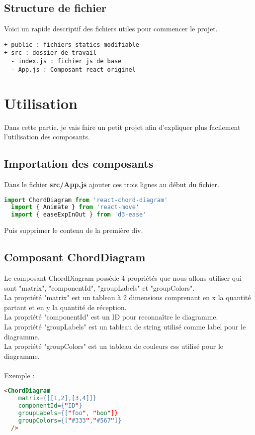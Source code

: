 \documentclass[a4paper, french, 12pt]{extarticle}
\begin{document}
\subsection{Structure de fichier}
Voici un rapide descriptif des fichiers utiles pour commencer le projet.
\begin{lstlisting}
+ public : fichiers statics modifiable
+ src : dossier de travail
  - index.js : fichier js de base
  - App.js : Composant react originel
\end{lstlisting}

\section{Utilisation}
Dans cette partie, je vais faire un petit projet afin d'expliquer plus facilement l'utilisation des composants.
\subsection{Importation des composants}
Dans le fichier \textbf{src/App.js} ajouter ces trois lignes au début du fichier.
\begin{lstlisting}[language=JavaScript]
  import ChordDiagram from 'react-chord-diagram'
  import { Animate } from 'react-move'
  import { easeExpInOut } from 'd3-ease'
\end{lstlisting}
Puis supprimer le contenu de la première div.
\pagebreak
\subsection{Composant ChordDiagram}
Le composant ChordDiagram possède 4 propriétés que nous allons utiliser qui sont "matrix", "componentId", "groupLabels" et "groupColors".\\
La propriété "matrix" est un tableau à 2 dimensions comprenant en x la quantité partant et en y la quantité de réception.\\
La propriété "componentId" est un ID pour reconnaître le diagramme.\\
La propriété "groupLabels" est un tableau de string utilisé comme label pour le diagramme.\\
La propriété "groupColors" est un tableau de couleurs css utilisé pour le diagramme.\\\\
Exemple : 
\begin{lstlisting}[language=html]
  <ChordDiagram
    matrix={[[1,2],[3,4]]}
    componentId={"ID"}
    groupLabels={["foo", "boo"]}
    groupColors={["#333","#567"]}
  />
\end{lstlisting}
\end{document}
